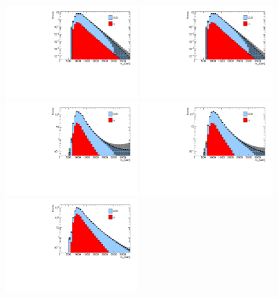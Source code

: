 \begin{figure}[htbp!]
\begin{center}
\includegraphics[angle=270, width=0.45\textwidth]{figures/boosted/Smooth/FourTag_pole_smoothed.pdf}
\includegraphics[angle=270, width=0.45\textwidth]{figures/boosted/Smooth/FourTag_pole_smoothed.pdf}\\
\includegraphics[angle=270, width=0.45\textwidth]{figures/boosted/Smooth/ThreeTag_l_smoothed.pdf}
\includegraphics[angle=270, width=0.45\textwidth]{figures/boosted/Smooth/ThreeTag_pole_smoothed.pdf}\\
\includegraphics[angle=270, width=0.45\textwidth]{figures/boosted/Smooth/TwoTag_split_l_smoothed.pdf}

\end{center}
\end{figure}
